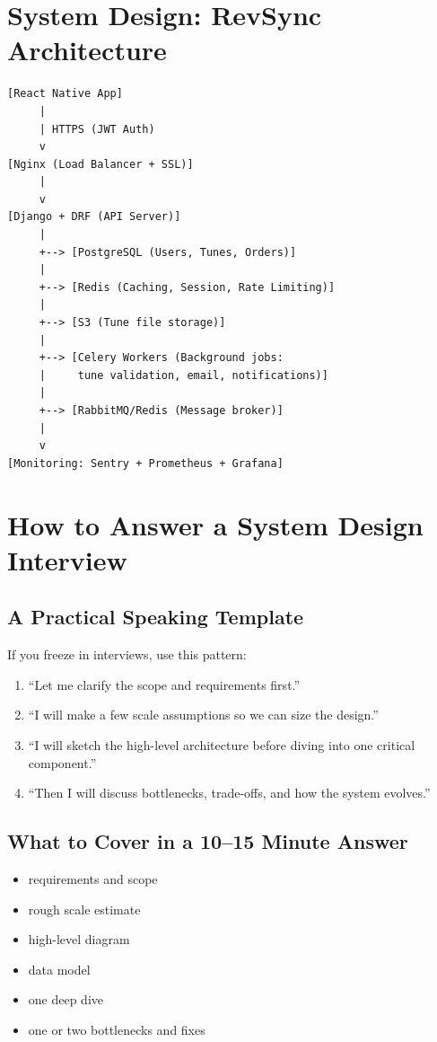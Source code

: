 \documentclass[12pt, a4paper, oneside]{book}
\begin{document}
\section{System Design: RevSync Architecture}

\begin{verbatim}
[React Native App]
     |
     | HTTPS (JWT Auth)
     v
[Nginx (Load Balancer + SSL)]
     |
     v
[Django + DRF (API Server)]
     |
     +--> [PostgreSQL (Users, Tunes, Orders)]
     |
     +--> [Redis (Caching, Session, Rate Limiting)]
     |
     +--> [S3 (Tune file storage)]
     |
     +--> [Celery Workers (Background jobs:
     |     tune validation, email, notifications)]
     |
     +--> [RabbitMQ/Redis (Message broker)]
     |
     v
[Monitoring: Sentry + Prometheus + Grafana]
\end{verbatim}

\section{How to Answer a System Design Interview}

\subsection{A Practical Speaking Template}

If you freeze in interviews, use this pattern:
\begin{enumerate}[leftmargin=2em]
    \item ``Let me clarify the scope and requirements first.''
    \item ``I will make a few scale assumptions so we can size the design.''
    \item ``I will sketch the high-level architecture before diving into one critical component.''
    \item ``Then I will discuss bottlenecks, trade-offs, and how the system evolves.''
\end{enumerate}

\subsection{What to Cover in a 10--15 Minute Answer}
\begin{itemize}[leftmargin=2em]
    \item requirements and scope
    \item rough scale estimate
    \item high-level diagram
    \item data model
    \item one deep dive
    \item one or two bottlenecks and fixes
\end{itemize}
\end{document}

